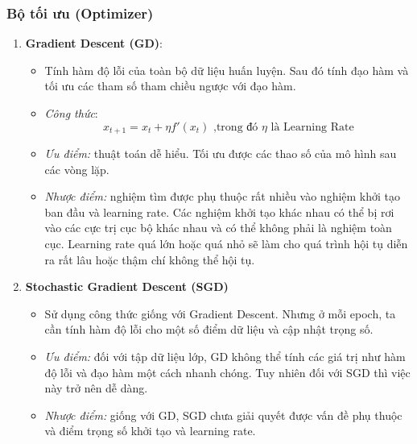 \subsubsection{Bộ tối ưu (Optimizer)}
\begin{enumerate}
	\item \textbf{Gradient Descent (GD)}: 
	\begin{itemize}
		\item Tính hàm độ lỗi của toàn bộ dữ liệu huấn luyện. Sau đó tính đạo hàm và tối ưu các tham số tham chiều ngược với đạo hàm.
		\item \textit{Công thức}:
		$$x_{t+1} = x_t + \eta f'(x_t)\text{  ,trong đó $\eta$ là Learning Rate}$$ 
		\item \textit{Ưu điểm: }thuật toán dễ hiểu. Tối ưu được các thao số của mô hình sau các vòng lặp.
		\item \textit{Nhược điểm: }nghiệm tìm được phụ thuộc rất nhiều vào nghiệm khởi tạo ban đầu và learning rate. Các nghiệm khởi tạo khác nhau có thể bị rơi vào các cực trị cục bộ khác nhau và có thể không phải là nghiệm toàn cục. Learning rate quá lớn hoặc quá nhỏ sẽ làm cho quá trình hội tụ diễn ra rất lâu hoặc thậm chí không thể hội tụ. 

	\end{itemize}	
	\item \textbf{Stochastic Gradient Descent (SGD)}
	\begin{itemize}
		\item Sử dụng công thức giống với Gradient Descent. Nhưng ở mỗi epoch, ta cần tính hàm độ lỗi cho một số điểm dữ liệu và cập nhật trọng số.
		\item \textit{Ưu điểm: }đối với tập dữ liệu lớp, GD không thể tính các giá trị như hàm độ lỗi và đạo hàm một cách nhanh chóng. Tuy nhiên đối với SGD thì việc này trở nên dễ dàng.
		\item \textit{Nhược điểm: }giống với GD, SGD chưa giải quyết được vấn đề phụ thuộc và điểm trọng số khởi tạo và learning rate.
	\end{itemize}


\end{enumerate}
